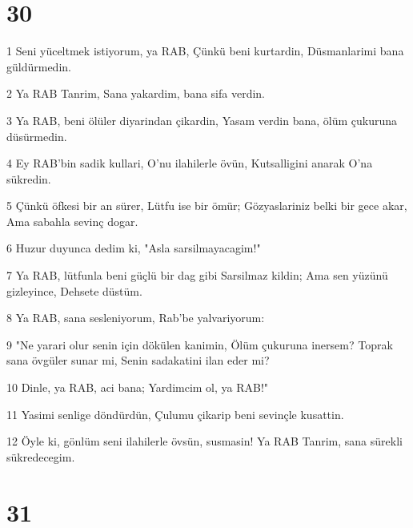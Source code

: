 \chapter{30}

\par 1 Seni yüceltmek istiyorum, ya RAB, Çünkü beni kurtardin, Düsmanlarimi bana güldürmedin.
\par 2 Ya RAB Tanrim, Sana yakardim, bana sifa verdin.
\par 3 Ya RAB, beni ölüler diyarindan çikardin, Yasam verdin bana, ölüm çukuruna düsürmedin.
\par 4 Ey RAB'bin sadik kullari, O'nu ilahilerle övün, Kutsalligini anarak O'na sükredin.
\par 5 Çünkü öfkesi bir an sürer, Lütfu ise bir ömür; Gözyaslariniz belki bir gece akar, Ama sabahla sevinç dogar.
\par 6 Huzur duyunca dedim ki, "Asla sarsilmayacagim!"
\par 7 Ya RAB, lütfunla beni güçlü bir dag gibi Sarsilmaz kildin; Ama sen yüzünü gizleyince, Dehsete düstüm.
\par 8 Ya RAB, sana sesleniyorum, Rab'be yalvariyorum:
\par 9 "Ne yarari olur senin için dökülen kanimin, Ölüm çukuruna inersem? Toprak sana övgüler sunar mi, Senin sadakatini ilan eder mi?
\par 10 Dinle, ya RAB, aci bana; Yardimcim ol, ya RAB!"
\par 11 Yasimi senlige döndürdün, Çulumu çikarip beni sevinçle kusattin.
\par 12 Öyle ki, gönlüm seni ilahilerle övsün, susmasin! Ya RAB Tanrim, sana sürekli sükredecegim.

\chapter{31}


